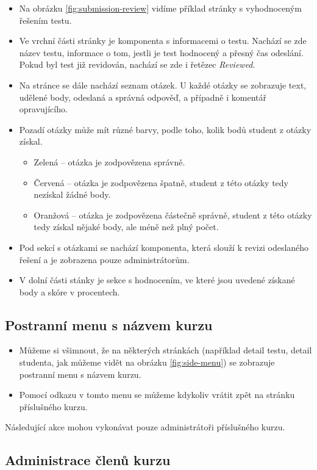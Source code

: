 \begin{itemize}
	\item Na obrázku \ref{fig:submission-review} vidíme příklad stránky s vyhodnoceným řešením testu.
	\item Ve vrchní části stránky je komponenta s informacemi o testu. Nachází se zde název testu, informace o tom, jestli je test hodnocený a přesný čas odeslání. Pokud byl test již revidován, nachází se zde i řetězec \textit{Reviewed}. 
	\item Na stránce se dále nachází seznam otázek. U každé otázky se zobrazuje text, udělené body, odeslaná a správná odpověď, a případně i komentář opravujícího.
	\item Pozadí otázky může mít různé barvy, podle toho, kolik bodů student z otázky získal.
		\begin{itemize}
			\item Zelená -- otázka je zodpovězena správně.
			\item Červená -- otázka je zodpovězena špatně, student z této otázky tedy nezískal žádné body.
			\item Oranžová -- otázka je zodpovězena částečně správně, student z této otázky tedy získal nějaké body, ale méně než plný počet.
		\end{itemize}
	\item Pod sekcí s otázkami se nachází komponenta, která slouží k revizi odeslaného řešení a je zobrazena pouze administrátorům.
	\item V dolní části stánky je sekce s hodnocením, ve které jsou uvedené získané body a skóre v procentech.
\end{itemize}

\subsection{Postranní menu s názvem kurzu}
 \begin{itemize}
 	\item Můžeme si všimnout, že na některých stránkách (například detail testu, detail studenta, jak můžeme vidět na obrázku \ref{fig:side-menu}) se zobrazuje postranní menu s názvem kurzu.
 	\item Pomocí odkazu v tomto menu se můžeme kdykoliv vrátit zpět na stránku příslušného kurzu.
 \end{itemize}


Následující akce mohou vykonávat pouze administrátoři příslušného kurzu.

\subsection{Administrace členů kurzu}

